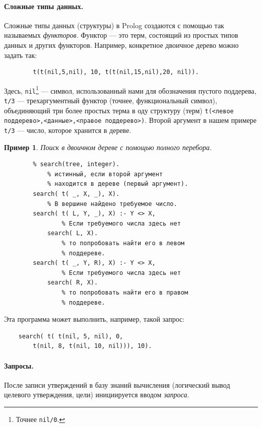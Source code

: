\documentclass[12pt, openany, twoside]{book} %
\newtheorem{example}{Пример}[chapter]
\begin{document}
\paragraph{Сложные типы данных.}\label{sec:complex_data}
Сложные типы данных (структуры) в Prolog создаются с помощью так называемых {\em функторов}. Функтор --- это терм, состоящий из простых типов данных и других функторов. Например, конкретное двоичное дерево можно задать так:
{\tt\begin{verbatim}
        t(t(nil,5,nil), 10, t(t(nil,15,nil),20, nil)).
\end{verbatim}}
Здесь, \texttt{nil}\footnote{Точнее \texttt{nil/0}.} --- символ, использованный нами для обозначения пустого поддерева, \texttt{t/3} --- трехаргументный функтор (точнее, функциональный символ), объединяющий три более простых терма в оду структуру (терм) \texttt{t(<левое поддерево>,<данные>,<правое поддерево>)}. Второй аргумент в нашем примере \texttt{t/3} --- число, которое хранится в дереве.

\begin{example} Поиск в двоичном дереве с помощью полного перебора.
\label{ex:treesearch}
\end{example}
{\tt\begin{verbatim}
        % search(tree, integer).
            % истинный, если второй аргумент
            % находится в дереве (первый аргумент).
        search( t( _, X, _), X).
            % В вершине найдено требуемое число.
        search( t( L, Y, _), X) :- Y <> X,
                % Если требуемого числа здесь нет
            search( L, X).
                % то попробовать найти его в левом
                % поддереве.
        search( t( _, Y, R), X) :- Y <> X,
                % Если требуемого числа здесь нет
            search( R, X).
                % то попробовать найти его в правом
                % поддереве.

\end{verbatim}}
\noindent Эта программа может выполнить, например, такой запрос:
{\tt\begin{verbatim}
    search( t( t(nil, 5, nil), 0,
        t(nil, 8, t(nil, 10, nil))), 10).
\end{verbatim}}

\paragraph{Запросы.} После записи утверждений в базу знаний вычисления (логический вывод целевого утверждения, цели) инициируется вводом \emph{запроса}.
\end{document}
